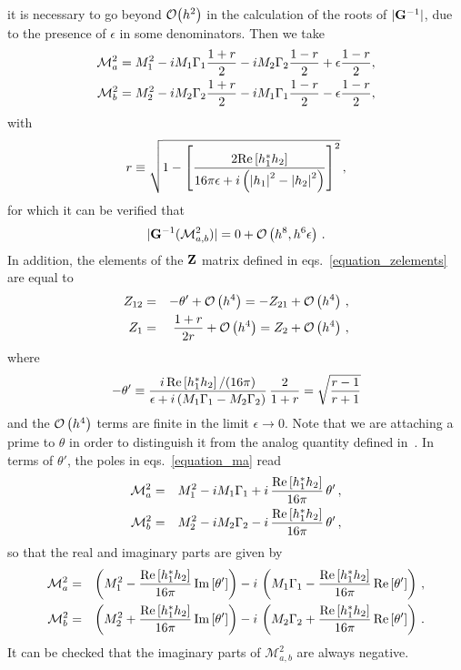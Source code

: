 \documentclass[11pt,a4paper]{article}
\providecommand{\abss}[1]{\left\lvert #1 \right\rvert^2}
\providecommand{\mire}[1]{{\rm Re} \left[ #1 \right]}
\providecommand{\miim}[1]{{\rm Im} \left[ #1 \right]}
\providecommand{\order}[1]{{\cal O} \left( #1 \right)}
\providecommand{\torder}[1]{{\cal O} \bigl( #1 \bigr)}
\providecommand{\cpm}[0]{\mathcal{M}}
\providecommand{\rf}[0]{r}
\begin{document}
 it is necessary to go beyond $\torder{h^2}$ in the calculation of the roots of $|{\bf G}^{-1}|$, due to the presence of $\epsilon$ in some denominators. Then we take
\begin{eqnarray}
\label{equation_ma}
\cpm_a^2 = M_1^2 - i M_1 \Gamma_1 \frac{1+\rf}{2} - i M_2 \Gamma_2 \frac{1-\rf}{2} + \epsilon \frac{1-\rf}{2} , \notag\\
\cpm_b^2 = M_2^2 - i M_2 \Gamma_2 \frac{1+\rf}{2} - i M_1 \Gamma_1 \frac{1-\rf}{2} - \epsilon \frac{1-\rf}{2},
\end{eqnarray} 
with
\begin{equation}
\label{equation_defr}
\rf \equiv \sqrt{1-\left[ \frac{2 \mire{h_1^* h_2}}{16 \pi \epsilon + i \left(\abss{h_1} - \abss{h_2} \right)} \right]^2} \, ,
\end{equation}
for which it can be verified that
\begin{equation}
|{\bf G}^{-1} (\cpm_{a,b}^2)| = 0 + \order{h^8, h^6 \epsilon}\, .
\end{equation}
In addition, the elements of the ${\bf Z}$ matrix defined in eqs.~\eqref{equation_zelements} are equal to
\begin{eqnarray}
\label{equation_zelements2}
Z_{12} &=& -\theta' + \order{h^4} = - Z_{21} + \order{h^4} \, ,\notag \\ 
Z_1 &=& \frac{1+\rf}{2 \rf}  + \order{h^4} = Z_2  + \order{h^4}\, , 
\end{eqnarray}
where
\begin{equation}
\label{equation_thetaprime}
- \theta' \equiv  \frac{i \, \mire{h_1^* h_2}/(16 \pi)}{\epsilon+ i \left(M_1 \Gamma_1 - M_2 \Gamma_2 \right)} \, \frac{2}{1+\rf} = \sqrt{\frac{\rf - 1}{\rf + 1}} 
\end{equation}
and the $\order{h^4}$ terms are finite in the limit $\epsilon \to 0$.
Note that we are attaching a prime to $\theta$ in order to distinguish it from the analog quantity defined in~\cite{Racker20}. In terms of $\theta'$, the poles in eqs.~\eqref{equation_ma} read
\begin{eqnarray}
\cpm_a^2 &=& M_1^2 - i M_1 \Gamma_1 + i \, \frac{\mire{h_1^* h_2}}{16 \pi} \, \theta' \, , \notag\\
\cpm_b^2 &=& M_2^2 - i M_2 \Gamma_2 - i \, \frac{\mire{h_1^* h_2}}{16 \pi} \, \theta' \, ,
\end{eqnarray}
so that the real and imaginary parts are given by
\begin{eqnarray}
\label{equation_cp2}
\cpm_a^2 &=& \left(M_1^2 - \frac{\mire{h_1^* h_2}}{16 \pi} \, \miim{\theta'} \right)  - i \, \left(M_1 \Gamma_1 - \frac{\mire{h_1^* h_2}}{16 \pi} \, \mire{\theta'} \right) \, , \notag \\
 \cpm_b^2 &=& \left(M_2^2 + \frac{\mire{h_1^* h_2}}{16 \pi} \, \miim{\theta'} \right)  - i \, \left(M_2 \Gamma_2 + \frac{\mire{h_1^* h_2}}{16 \pi} \, \mire{\theta'} \right) \, .
\end{eqnarray}
It can be checked that the imaginary parts of $\cpm_{a,b}^2$ are always negative. 
\end{document}
